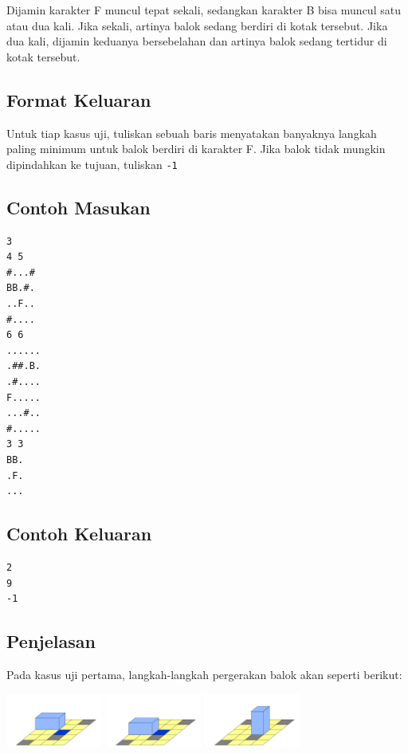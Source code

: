 \documentclass{article}
\begin{document}
Dijamin karakter F muncul tepat sekali, sedangkan karakter B bisa muncul satu atau dua kali. Jika sekali, artinya balok sedang berdiri di kotak tersebut. Jika dua kali, dijamin keduanya bersebelahan dan artinya balok sedang tertidur di kotak tersebut.

\subsection*{Format Keluaran}
Untuk tiap kasus uji, tuliskan sebuah baris menyatakan banyaknya langkah paling minimum untuk balok berdiri di karakter F. Jika balok tidak mungkin dipindahkan ke tujuan, tuliskan \lstinline{-1}
\\
\begin{multicols}{2}
\subsection*{Contoh Masukan}
\begin{lstlisting}
3
4 5
#...#
BB.#.
..F..
#....
6 6
......
.##.B.
.#....
F.....
...#..
#.....
3 3
BB.
.F.
...
\end{lstlisting}
\columnbreak
\subsection*{Contoh Keluaran}
\begin{lstlisting}
2
9
-1
\end{lstlisting}
\vfill
\null
\end{multicols}


\subsection*{Penjelasan}
Pada kasus uji pertama, langkah-langkah pergerakan balok akan seperti berikut:

\includegraphics[width=120px]{sample-1-1}
\includegraphics[width=120px]{sample-1-2}
\includegraphics[width=120px]{sample-1-3}

\pagebreak
\end{document}
